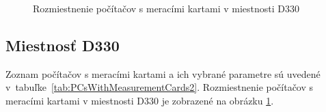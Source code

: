 \documentclass[a4paper, 10pt, ]{article}
\begin{document}
\begin{figure}[t]
    \centering

    \makebox[\textwidth][c]{%
    
    }

    \caption{Rozmiestnenie počítačov s meracími kartami v miestnosti D330} 
    \label{D330map_v1}

\end{figure}



\subsection{Miestnosť D330}

Zoznam počítačov s meracími kartami a ich vybrané parametre sú uvedené v~tabuľke~\ref{tab:PCsWithMeasurementCards2}. Rozmiestnenie počítačov s meracími kartami v miestnosti D330 je zobrazené na obrázku \ref{D330map_v1}.
\end{document}

